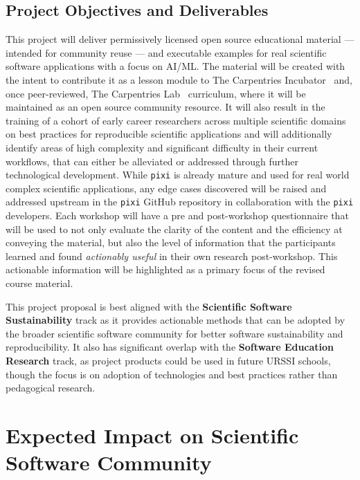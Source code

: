\documentclass[letterpaper, 11pt]{article}
\newcommand{\program}{URSSI}
\newcommand{\pixi}{\texttt{pixi}}
\begin{document}
\subsection{Project Objectives and Deliverables}
This project will deliver permissively licensed open source educational material --- intended for community reuse --- and executable examples for real scientific software applications with a focus on AI/ML.
The material will be created with the intent to contribute it as a lesson module to The Carpentries Incubator~\cite{carpentries_incubator_proposals} and, once peer-reviewed, The Carpentries Lab~\cite{carpentries_lab} curriculum, where it will be maintained as an open source community resource.
It will also result in the training of a cohort of early career researchers across multiple scientific domains on best practices for reproducible scientific applications and will additionally identify areas of high complexity and significant difficulty in their current workflows, that can either be alleviated or addressed through further technological development.
While \pixi{} is already mature and used for real world complex scientific applications, any edge cases discovered will be raised and addressed upstream in the \pixi{} GitHub repository in collaboration with the \pixi{} developers.
Each workshop will have a pre and post-workshop questionnaire that will be used to not only evaluate the clarity of the content and the efficiency at conveying the material, but also the level of information that the participants learned and found \emph{actionably useful} in their own research post-workshop.
This actionable information will be highlighted as a primary focus of the revised course material.

This project proposal is best aligned with the \textbf{Scientific Software Sustainability} track as it provides actionable methods that can be adopted by the broader scientific software community for better software sustainability and reproducibility.
It also has significant overlap with the \textbf{Software Education Research} track, as project products could be used in future \program{} schools, though the focus is on adoption of technologies and best practices rather than pedagogical research.
%

\section{Expected Impact on Scientific Software Community}
\end{document}
